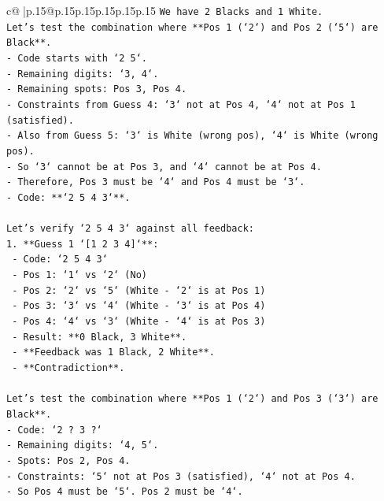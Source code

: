 \documentclass{article}
\begin{document}
{\begin{supertabular}{c@{$\;$}|p{.15\linewidth}@{}p{.15\linewidth}p{.15\linewidth}p{.15\linewidth}p{.15\linewidth}p{.15\linewidth}}
{{{\texttt{We have 2 Blacks and 1 White.} \\
\texttt{Let's test the combination where **Pos 1 (`2`) and Pos 2 (`5`) are Black**.} \\
\texttt{{-}   Code starts with `2 5`.} \\
\texttt{{-}   Remaining digits: `3, 4`.} \\
\texttt{{-}   Remaining spots: Pos 3, Pos 4.} \\
\texttt{{-}   Constraints from Guess 4: `3` not at Pos 4, `4` not at Pos 1 (satisfied).} \\
\texttt{{-}   Also from Guess 5: `3` is White (wrong pos), `4` is White (wrong pos).} \\
\texttt{{-}   So `3` cannot be at Pos 3, and `4` cannot be at Pos 4.} \\
\texttt{{-}   Therefore, Pos 3 must be `4` and Pos 4 must be `3`.} \\
\texttt{{-}   Code: **`2 5 4 3`**.} \\
\\ 
\texttt{Let's verify `2 5 4 3` against all feedback:} \\
\texttt{1.  **Guess 1 `{[}1 2 3 4{]}`**:} \\
\texttt{    {-}   Code: `2 5 4 3`} \\
\texttt{    {-}   Pos 1: `1` vs `2` (No)} \\
\texttt{    {-}   Pos 2: `2` vs `5` (White {-} `2` is at Pos 1)} \\
\texttt{    {-}   Pos 3: `3` vs `4` (White {-} `3` is at Pos 4)} \\
\texttt{    {-}   Pos 4: `4` vs `3` (White {-} `4` is at Pos 3)} \\
\texttt{    {-}   Result: **0 Black, 3 White**.} \\
\texttt{    {-}   **Feedback was 1 Black, 2 White**.} \\
\texttt{    {-}   **Contradiction**.} \\
\\ 
\texttt{Let's test the combination where **Pos 1 (`2`) and Pos 3 (`3`) are Black**.} \\
\texttt{{-}   Code: `2 ? 3 ?`} \\
\texttt{{-}   Remaining digits: `4, 5`.} \\
\texttt{{-}   Spots: Pos 2, Pos 4.} \\
\texttt{{-}   Constraints: `5` not at Pos 3 (satisfied), `4` not at Pos 4.} \\
\texttt{{-}   So Pos 4 must be `5`. Pos 2 must be `4`.} \\
}}}
\end{supertabular}}
\end{document}
